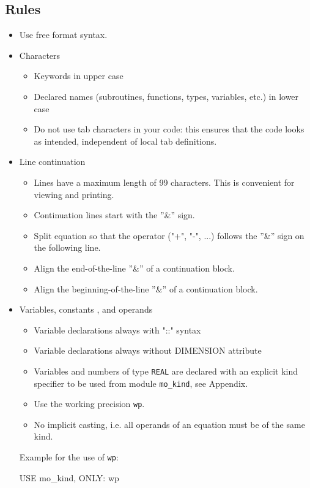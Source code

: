 \documentclass[a4paper,11pt,DIV16,BCOR1cm,titlepage]{scrartcl}
\begin{document}
\subsection{Rules}
%
\begin{itemize}  
\item Use free format syntax.
%
\item Characters
\begin{itemize}
\item Keywords in upper case
\item Declared names (subroutines, functions, types, variables, etc.) in lower case
\item Do not use tab characters in your code: this ensures that  the code looks as intended, 
independent of local tab definitions. 
\end{itemize}
%
\item Line continuation  
\begin{itemize}
\item Lines have a maximum length of 99 characters. This is convenient for viewing and printing.
\item Continuation lines start with the ''\&'' sign.
\item Split equation so that the operator ("+", "-", ...) follows the ''\&'' sign on the following line.
\item Align the end-of-the-line ''\&'' of a continuation block.
\item Align the beginning-of-the-line ''\&'' of a continuation block.
\end{itemize}
%
\item Variables, constants , and operands
\begin{itemize}
\item Variable declarations always with "::" syntax
\item Variable declarations always without DIMENSION attribute
\item Variables and numbers of type \texttt{REAL} are declared with an explicit kind 
specifier to be used from module \texttt{mo\_kind}, see Appendix.
\item Use the working precision \texttt{wp}.
\item No implicit casting, i.e. all operands of an equation must be of the same kind.
\end{itemize}

Example for the use of  \texttt{wp}:  

\begin{fortran}  
USE mo_kind, ONLY: wp  
  

\end{fortran}
\end{itemize}
\end{document}
